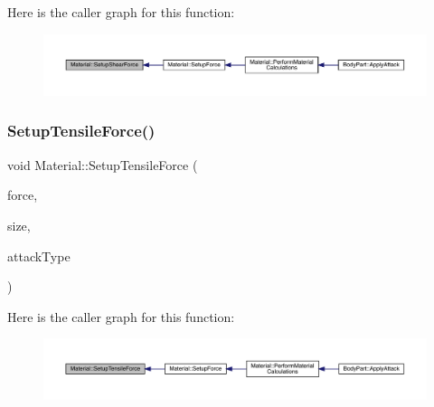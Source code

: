 Here is the caller graph for this function\+:
\nopagebreak
\begin{figure}[H]
\begin{center}
\leavevmode
\includegraphics[width=350pt]{dc/dee/class_material_a65d6bf35a560e97da3468e91178facdc_icgraph}
\end{center}
\end{figure}
\mbox{\label{class_material_a9d67ba42a8823f287b382ea069b7afe9}} 
\subsubsection{\texorpdfstring{Setup\+Tensile\+Force()}{SetupTensileForce()}}
{\footnotesize\ttfamily void Material\+::\+Setup\+Tensile\+Force (\begin{DoxyParamCaption}\item[{float}]{force,  }\item[{float}]{size,  }\item[{\mbox{\hyperlink{_enum_types_8hpp_a904b2f9c8f3951116c343784c59d6afe}{Attack\+Type}}}]{attack\+Type }\end{DoxyParamCaption})\hspace{0.3cm}{\ttfamily [private]}}

Here is the caller graph for this function\+:
\nopagebreak
\begin{figure}[H]
\begin{center}
\leavevmode
\includegraphics[width=350pt]{dc/dee/class_material_a9d67ba42a8823f287b382ea069b7afe9_icgraph}
\end{center}
\end{figure}
\mbox{\label{class_material_a767010a40d459c05e14afc641217a21b}} 
